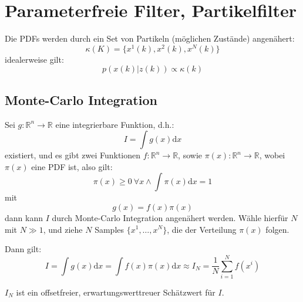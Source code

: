 \chapter{Parameterfreie Filter, Partikelfilter}
Die PDFs werden durch ein Set von Partikeln (möglichen Zustände) angenähert:
\begin{equation*}
    \kappa(K) = \{x^1(k), x^2(k), x^N(k)\}
\end{equation*}
idealerweise gilt:
\begin{equation*}
    p(x(k)|z(k)) \propto \kappa(k)
\end{equation*}

\section{Monte-Carlo Integration}
Sei $g: \mathbb{R}^n \to \mathbb{R}$ eine integrierbare Funktion, d.h.:
\begin{equation*}
    I = \int g(x) \text{d}x
\end{equation*}
existiert, und es gibt zwei Funktionen $f: \mathbb{R}^n \to \mathbb{R}$, sowie
$\pi(x): \mathbb{R}^n \to \mathbb{R}$, wobei $\pi(x)$ eine PDF ist, also gilt:
\begin{equation*}
    \pi(x) \geq 0\ \forall x \land \int \pi(x) \text{d}x = 1
\end{equation*}
mit
\begin{equation*}
    g(x) = f(x) \pi(x)
\end{equation*}
dann kann $I$ durch Monte-Carlo Integration angenähert werden.
Wähle hierfür $N$ mit $N \gg 1$, und ziehe $N$ Samples $\{x^1, \ldots, x^N\}$, 
die der Verteilung $\pi(x)$ folgen.

Dann gilt:
\begin{equation*}
    I = \int g(x) \text{d}x = \int f(x) \pi(x) \text{d}x \approx
        I_N = \frac{1}{N} \sum_{i=1}^N f(x^i)
\end{equation*}

$I_N$ ist ein offsetfreier, erwartungswerttreuer Schätzwert für $I$.

